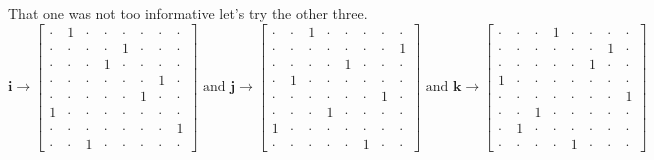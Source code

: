 \documentclass[12pt]{article}
\newcommand{\ii}{\mathbf{i}}
\newcommand{\jj}{\mathbf{j}}
\newcommand{\kk}{\mathbf{k}}
\begin{document}
That one was not too informative let's try the other three.   
$$\ii \to \left[ \begin{array}{cccc|cccc}
\cdot & 1 & \cdot & \cdot & \cdot & \cdot & \cdot & \cdot \\
\cdot & \cdot & \cdot & \cdot & 1 & \cdot & \cdot & \cdot \\
\cdot & \cdot & \cdot & 1 & \cdot & \cdot & \cdot & \cdot \\
\cdot & \cdot & \cdot & \cdot & \cdot & \cdot & 1 & \cdot \\ \hline 
\cdot & \cdot & \cdot & \cdot & \cdot & 1 & \cdot & \cdot \\
1 & \cdot & \cdot & \cdot & \cdot & \cdot & \cdot & \cdot \\
\cdot & \cdot & \cdot & \cdot & \cdot & \cdot & \cdot & 1 \\
\cdot & \cdot & 1 & \cdot & \cdot & \cdot & \cdot & \cdot  \end{array}\right] \text{ and } \jj \to 
\left[ \begin{array}{cccc|cccc}
\cdot & \cdot & 1 & \cdot & \cdot & \cdot & \cdot & \cdot \\
\cdot & \cdot & \cdot & \cdot & \cdot & \cdot & \cdot & 1 \\
\cdot & \cdot & \cdot & \cdot & 1 & \cdot & \cdot & \cdot \\
\cdot & 1 & \cdot & \cdot & \cdot & \cdot & \cdot & \cdot \\ \hline 
\cdot & \cdot & \cdot & \cdot & \cdot & \cdot & 1 & \cdot \\
\cdot & \cdot & \cdot & 1 & \cdot & \cdot & \cdot & \cdot \\
1 & \cdot & \cdot & \cdot & \cdot & \cdot & \cdot & \cdot \\
\cdot & \cdot & \cdot & \cdot & \cdot & 1 & \cdot & \cdot  \end{array}\right]
\text{ and }
\kk \to 
\left[ \begin{array}{cccc|cccc}
\cdot & \cdot & \cdot & 1 &  \cdot & \cdot & \cdot & \cdot \\
\cdot & \cdot & \cdot & \cdot & \cdot & \cdot &  1 & \cdot \\
\cdot & \cdot & \cdot & \cdot & \cdot & 1  & \cdot & \cdot \\
 1 & \cdot & \cdot & \cdot & \cdot & \cdot & \cdot & \cdot \\ \hline 
\cdot & \cdot & \cdot & \cdot & \cdot & \cdot & \cdot & 1  \\
\cdot & \cdot & 1 & \cdot & \cdot & \cdot & \cdot & \cdot \\
\cdot & 1 & \cdot & \cdot & \cdot & \cdot & \cdot & \cdot \\
\cdot & \cdot & \cdot & \cdot & 1 & \cdot & \cdot & \cdot  \end{array}\right]
$$
\end{document}
